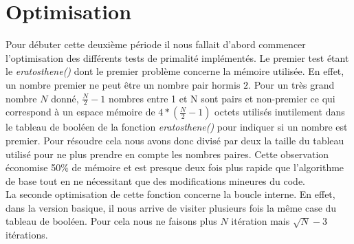 		
	\section{Optimisation}
	Pour débuter cette deuxième période il nous fallait d'abord commencer l'optimisation des différents tests de primalité implémentés. Le premier test étant le \textit{eratosthene()} dont le premier problème concerne la mémoire utilisée. En effet, un nombre premier ne peut être un nombre pair hormis $2$. Pour un très grand nombre $N$ donné, $\frac{N}{2}-1$ nombres entre 1 et N sont pairs et non-premier ce qui correspond à un espace mémoire de $4*(\frac{N}{2}-1)$ octets utilisés inutilement dans le tableau de booléen de la fonction \textit{eratosthene()} pour indiquer si un nombre est premier. Pour résoudre cela nous avons donc divisé par deux la taille du tableau utilisé pour ne plus prendre en compte les nombres paires. Cette observation économise 50\% de mémoire et est presque deux fois plus rapide que l'algorithme de base tout en ne nécessitant que des modifications mineures du code.\\
La seconde optimisation de cette fonction concerne la boucle interne. En effet, dans la version basique, il nous arrive de visiter plusieurs fois la même case du tableau de booléen. Pour cela nous ne faisons plus $N$ itération mais $\sqrt{N}-3$ itérations.

